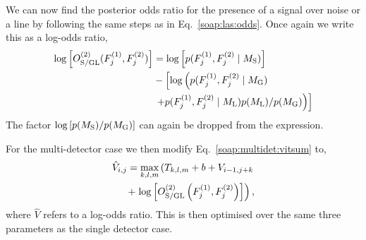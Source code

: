 %
We can now find the posterior odds ratio for the presence of a signal over noise or a line by following the same steps as in Eq.~\ref{soap:las:odds}. Once again we write this as a log-odds ratio,
\begin{equation}
\begin{split}
\label{soap:lineaware:logodds}
\log\left[ O^{(2)}_{\rm{S/GL}}(F^{(1)}_{j},F^{(2)}_{j})\right] &=  \log\left[ p(F^{(1)}_{j},F^{(2)}_{j} \mid M_{\rm{S}}) \right] \\
&- \left[ \log\left( p(F^{(1)}_{j},F^{(2)}_{j}\mid M_{\rm{G}}) \right. \right. \\
&\left.\left.+  p(F^{(1)}_{j},F^{(2)}_{j}\mid M_{\rm{L}})p(M_{\rm{L}})/p(M_{\rm{G}})\right) \right]
\end{split}
\end{equation}
The factor $\log\left[ p(M_{\rm{S}})/p(M_{\rm{G}})\right]$ can again be dropped from the expression.

For the multi-detector case we then modify Eq.~\ref{soap:multidet:vitsum} to,
\begin{equation}
\begin{split}
\label{soap:lineaware:stat:multi}
\hat{V}_{i,j} = \max_{k,l,m}\left(T_{k,l,m} + b + V_{i-1,j+k}   \right. \\
 + \left.  \log\left[O^{(2)}_{\rm{S/GL}}\left(F^{(1)}_{j},F^{(2)}_{j}\right)\right]\right),
\end{split}
\end{equation}
%
where $\hat{V}$ refers to a log-odds ratio.
This is then optimised over the same three parameters as the single detector case.

